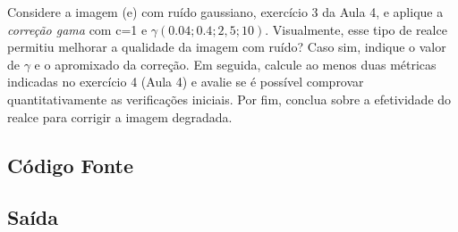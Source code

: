 \documentclass[10pt,a4paper]{article}
\begin{document}
Considere a imagem (e) com ruído gaussiano, exercício 3 da Aula 4, e aplique a \textit{correção gama} com c=1 e \( {\gamma} (0.04; 0.4; 2,5; 10)\). Visualmente, esse tipo de realce permitiu melhorar a qualidade da imagem com ruído? Caso sim, indique o valor de \({\gamma}\) e o apromixado da correção. Em seguida, calcule ao menos duas métricas indicadas no exercício 4 (Aula 4) e avalie se é possível comprovar quantitativamente as verificações iniciais. Por fim, conclua sobre a efetividade do realce para corrigir a imagem degradada.

\subsection{Código Fonte}



\subsection{Saída}


\end{document}
